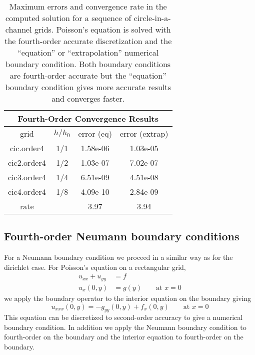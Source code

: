\begin{table}[hbt]
\begin{center}
\begin{tabular}{|c|c|c|c|} \hline 
 \multicolumn{4}{|c|}{Fourth-Order Convergence Results}\\   \hline 
 grid         &   $h/h_0$  & error (eq)  & error (extrap)   \\   \hline 
 cic.order4   &   1/1      & 1.58e-06  & 1.03e-05       \\ 
 cic2.order4  &   1/2      & 1.03e-07  & 7.02e-07       \\ 
 cic3.order4  &   1/4      & 6.51e-09  & 4.51e-08       \\ 
 cic4.order4  &   1/8      & 4.09e-10  & 2.84e-09       \\ \hline 
  rate        &              &  3.97     & 3.94  \\ \hline   
\end{tabular} \qquad
\end{center}
\caption{Maximum errors and convergence rate in the computed solution for a sequence of circle-in-a-channel grids.
   Poisson's equation is solved with the fourth-order accurate discretization and the ``equation'' or
``extrapolation'' numerical 
boundary condition. Both boundary conditions are fourth-order accurate but the ``equation'' boundary condition
gives more accurate results and converges faster.}
\label{tab:fourthOrderAccuracy} 
\end{table}



\clearpage
\subsection{Fourth-order Neumann boundary conditions}


For a Neumann boundary condition we proceed in a similar way as for the dirichlet case. For Poisson's
equation on a rectangular grid,
\begin{align*}
   u_{xx} + u_{yy} &= f \\
   u_x(0,y) & = g(y) \qquad \mbox{at $x=0$}
\end{align*}
we apply the boundary operator to the interior equation on the boundary giving
\[
   u_{xxx}(0,y) = - g_{yy}(0,y) + f_x(0,y)\qquad \mbox{at $x=0$}
\]
This equation can be discretized to second-order accuracy to give a numerical boundary condition.
In addition we apply the Neumann boundary condition to fourth-order on the boundary and
the interior equation to fourth-order on the boundary. 

